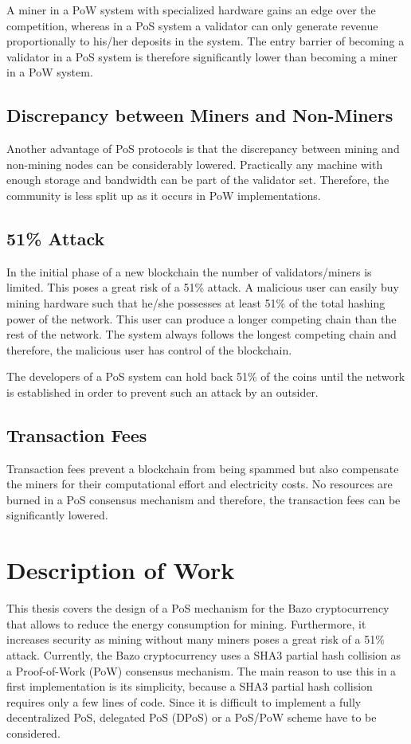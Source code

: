  A miner in a PoW system with specialized hardware gains an edge over the competition, whereas in a PoS system a validator can only generate revenue proportionally to his/her deposits in the system. The entry barrier of becoming a validator in a PoS system is therefore significantly lower than becoming a miner in a PoW system.


\subsection{Discrepancy between Miners and Non-Miners}
Another advantage of PoS protocols is that the discrepancy between mining and non-mining nodes can be considerably lowered. Practically any machine with enough storage and bandwidth can be part of the validator set. Therefore, the community is less split up as it occurs in PoW implementations.

\subsection{51\% Attack}
In the initial phase of a new blockchain the number of validators/miners is limited. This poses a great risk of a 51\% attack. A malicious user can easily buy mining hardware such that he/she possesses at least 51\% of the total hashing power of the network. This user can produce a longer competing chain than the rest of the network. The system always follows the longest competing chain and therefore, the malicious user has control of the blockchain. 

The developers of a PoS system can hold back 51\% of the coins until the network is established in order to prevent such an attack by an outsider.

\subsection{Transaction Fees}
Transaction fees prevent a blockchain from being spammed but also compensate the miners for their computational effort and electricity costs. No resources are burned in a PoS consensus mechanism and therefore, the transaction fees can be significantly lowered. 

\section{Description of Work}
This thesis covers the design of a PoS mechanism for the Bazo cryptocurrency that allows to reduce the energy consumption for mining. Furthermore, it increases security as mining without many miners poses a great risk of a 51\% attack. Currently, the Bazo cryptocurrency uses a SHA3 partial hash collision as a Proof-of-Work (PoW) consensus mechanism. The main reason to use this in a first implementation is its simplicity, because a SHA3 partial hash collision requires only a few lines of code. Since it is difficult to implement a fully decentralized PoS, delegated PoS (DPoS) or a PoS/PoW scheme have to be considered.

